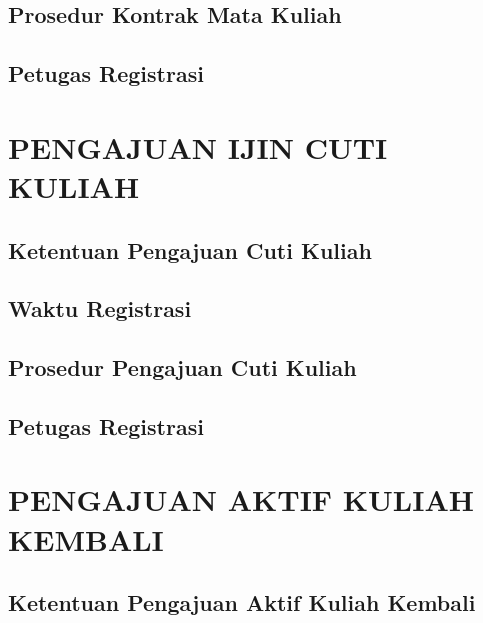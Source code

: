 \documentclass[
]{book}
\begin{document}
\hypertarget{prosedur-kontrak-mata-kuliah-1}{%
\section{Prosedur Kontrak Mata Kuliah}\label{prosedur-kontrak-mata-kuliah-1}}

\hypertarget{petugas-registrasi-1}{%
\section{Petugas Registrasi}\label{petugas-registrasi-1}}

\hypertarget{pengajuan-ijin-cuti-kuliah}{%
\chapter{PENGAJUAN IJIN CUTI KULIAH}\label{pengajuan-ijin-cuti-kuliah}}

\hypertarget{ketentuan-pengajuan-cuti-kuliah}{%
\section{Ketentuan Pengajuan Cuti Kuliah}\label{ketentuan-pengajuan-cuti-kuliah}}

\hypertarget{waktu-registrasi-2}{%
\section{Waktu Registrasi}\label{waktu-registrasi-2}}

\hypertarget{prosedur-pengajuan-cuti-kuliah}{%
\section{Prosedur Pengajuan Cuti Kuliah}\label{prosedur-pengajuan-cuti-kuliah}}

\hypertarget{petugas-registrasi-2}{%
\section{Petugas Registrasi}\label{petugas-registrasi-2}}

\hypertarget{pengajuan-aktif-kuliah-kembali}{%
\chapter{PENGAJUAN AKTIF KULIAH KEMBALI}\label{pengajuan-aktif-kuliah-kembali}}

\hypertarget{ketentuan-pengajuan-aktif-kuliah-kembali}{%
\section{Ketentuan Pengajuan Aktif Kuliah Kembali}\label{ketentuan-pengajuan-aktif-kuliah-kembali}}
\end{document}
